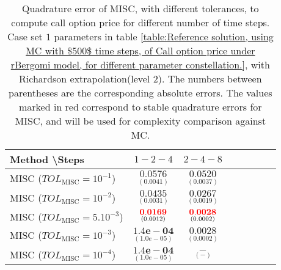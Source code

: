 \begin{table}[!h]
	\centering
	\begin{tabular}{l*{6}{c}r}
		Method \textbackslash  Steps            & $1-2-4$ & $2-4-8$  \\
		\hline
		MISC ($TOL_{\text{MISC}}=10^{-1}$)  & $\underset{(   0.0041)}{\mathbf{  0.0576}}$ & $\underset{(0.0037)}{\mathbf{0.0520}}$  \\
		MISC ($TOL_{\text{MISC}}=10^{-2}$)  & $\underset{(0.0031)}{\mathbf{0.0435}}$ &    $\underset{(0.0019)}{\mathbf{0.0267}}$   \\
		
		MISC ($TOL_{\text{MISC}}=5.10^{-3}$)  & $\underset{(0.0012)}{\mathbf{
				{\color{red}0.0169}}}$ &    $\underset{(0.0002
			)}{\mathbf{{\color{red} 0.0028}}}$ \\
		MISC ($TOL_{\text{MISC}}=10^{-3}$)  & $\underset{(1.0e-05
			)}{\mathbf{
				1.4e-04}}$ &    $\underset{(0.0002
			)}{\mathbf{ 0.0028}}$ \\
		
		MISC ($TOL_{\text{MISC}}=10^{-4}$)  & $\underset{(1.0e-05
			)}{\mathbf{
				1.4e-04}}$&    $\underset{(-
			
			)}{\mathbf{-}}$   \\
		\hline
	\end{tabular}
	\caption{Quadrature error of MISC, with different tolerances, to compute call option price for different number of time steps. Case set $1$ parameters in table \ref{table:Reference solution, using MC with $500$ time steps, of Call option price under rBergomi model, for different parameter constellation.}, with Richardson extrapolation(level $2$). The numbers between parentheses are the corresponding absolute errors. The values marked in red correspond to stable quadrature errors for MISC, and will be used for complexity comparison against MC.}
	\label{Quadrature error of MISC to compute Call option price of the different tolerances for different number of time steps. Case set $1$ parameters, with Richardson extrapolation(level $2$). The numbers between parentheses are the corresponding absolute errors.}
\end{table}


\FloatBarrier


